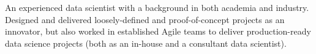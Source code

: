 An experienced data scientist with a background in both academia and industry.\\
Designed and delivered loosely-defined and proof-of-concept projects as an innovator, but also worked in established Agile teams to deliver production-ready data science projects (both as an in-house and a consultant data scientist).\\

